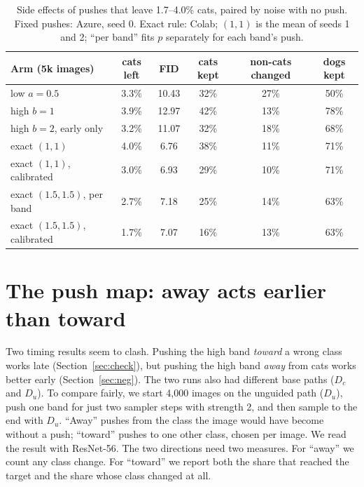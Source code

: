 \documentclass[11pt]{article}
\begin{document}
\begin{table}[t]
  \centering
  \small
  \caption{Side effects of pushes that leave 1.7--4.0\% cats, paired by noise with no push. Fixed pushes: Azure, seed 0.
  Exact rule: Colab; $(1,1)$ is the mean of seeds 1 and 2; ``per band'' fits $p$ separately for each band's push.}
  \label{tab:collateral}
  \begin{tabular}{lccccc}
    \toprule
    Arm (5k images) & cats left & FID & cats kept & non-cats changed & dogs kept \\
    \midrule
    low $a = 0.5$                    & 3.3\% & 10.43 & 32\% & 27\% & 50\% \\
    high $b = 1$                     & 3.9\% & 12.97 & 42\% & 13\% & 78\% \\
    high $b = 2$, early only         & 3.2\% & 11.07 & 32\% & 18\% & 68\% \\
    exact $(1,1)$                    & 4.0\% & 6.76  & 38\% & 11\% & 71\% \\
    exact $(1,1)$, calibrated        & 3.0\% & 6.93  & 29\% & 10\% & 71\% \\
    exact $(1.5,1.5)$, per band      & 2.7\% & 7.18  & 25\% & 14\% & 63\% \\
    exact $(1.5,1.5)$, calibrated    & 1.7\% & 7.07  & 16\% & 13\% & 63\% \\
    \bottomrule
  \end{tabular}
\end{table}

\section{The push map: away acts earlier than toward}
\label{sec:pmap}

Two timing results seem to clash. Pushing the high band \emph{toward} a wrong class works late
(Section~\ref{sec:check}), but pushing the high band \emph{away} from cats works better early (Section~\ref{sec:neg}).
The two runs also had different base paths ($D_c$ and $D_u$). To compare fairly, we start 4,000 images on the
unguided path ($D_u$), push one band for just two sampler steps with strength 2, and then sample to the end with
$D_u$. ``Away'' pushes from the class the image would have become without a push; ``toward'' pushes to one other
class, chosen per image. We read the result with ResNet-56. The two directions need two measures. For ``away'' we
count any class change. For ``toward'' we report both the share that reached the target and the share whose class
changed at all.
\end{document}
